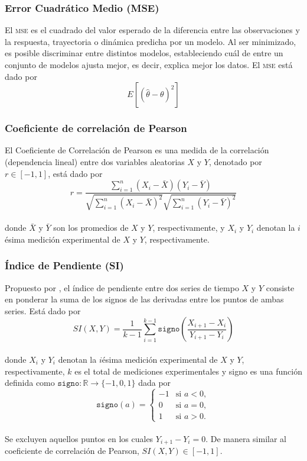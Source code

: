 \subsubsection{Error Cuadrático Medio (MSE)}

El \textsc{mse} \citep{msewiki} es el cuadrado del valor esperado de la diferencia entre las observaciones y la respuesta, trayectoria o dinámica predicha por un modelo. Al ser minimizado, es posible discriminar entre distintos modelos, estableciendo cuál de entre un conjunto de modelos ajusta mejor, es decir, explica mejor los datos. El \textsc{mse} está dado por $$E[(\hat{\theta} - \theta)^2]$$

\subsubsection{Coeficiente de correlación de Pearson}

El Coeficiente de Correlación de Pearson \citep{pearsoncorrwiki} es una medida de la correlación (dependencia lineal) entre dos variables aleatorias $X$ y $Y$, denotado por $r \in [-1, 1]$, está dado por
\begin{equation} 
r = \frac{\sum_{i=1}^n (X_i - \bar{X})(Y_i - \bar{Y})} {\sqrt{\sum_{i=1}^n (X_i - \bar{X})^2} \sqrt{\sum_{i=1}^n (Y_i - \bar{Y})^2}}
\end{equation}
\\
donde $\bar{X}$ y $\bar{Y}$ son los promedios de $X$ y $Y$, respectivamente, y $X_i$ y $Y_i$ denotan la $i$ésima medición experimental de $X$ y $Y$, respectivamente.

\subsubsection{Índice de Pendiente (SI)}

Propuesto por \citeauthor{Cho2006} \citep{Cho2006}, el índice de pendiente entre dos series de tiempo $X$ y $Y$ consiste en ponderar la suma de los signos de las derivadas entre los puntos de ambas series. Está dado por 
\begin{equation}
SI(X,Y) = \frac{1}{k - 1} \sum_{i=1}^{k-1} \mathtt{signo} \left(\frac{X_{i+1} - X_i} {Y_{i+1} - Y_i}\right)
\end{equation}
\\
donde $X_i$ y $Y_i$ denotan la $i$ésima medición experimental de $X$ y $Y$, respectivamente, $k$ es el total de mediciones experimentales y signo es una función  definida como $\mathtt{signo}: \mathbb{R} \rightarrow \{ -1,0,1 \} $ dada por
\begin{equation*}
  \mathtt{signo}(a) = \left\{
    \begin{array}{rl}
      -1 & \text{si } a < 0,\\
      0 & \text{si } a = 0,\\
      1 & \text{si } a > 0.
    \end{array} \right.
\end{equation*}
\\
Se excluyen aquellos puntos en los cuales $Y_{i+1} - Y_i = 0$. De manera similar al coeficiente de correlación de Pearson, $SI(X,Y)\in [-1, 1]$. 



